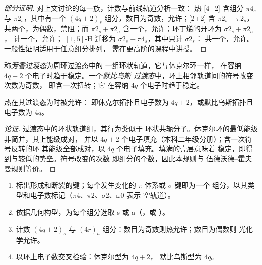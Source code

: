 \begin{proof}[部分证明]
对上文讨论的每一族，计数与前线轨道分析一致：
热 [4+2] 含组分 $\pi4_s$ 与 $\pi2_s$，其中有一个 $(4q + 2)_s$
组分，数目为奇数，允许；[2+2] 含 $\pi2_s + \pi2_s$，共两个，为偶数，禁阻；而
$\pi2_s + \pi2_a$ 含一个，允许；环丁烯的开环为 $\sigma2_s + \pi2_a$，
计一个，允许； $[1,5]$-H 迁移为 $\sigma2_s + \pi4_s$，其中只计 $\sigma2_s$：
共一个，允许。一般性证明适用于任意组分排列，
需在更高阶的课程中讲授。
\end{proof}

\begin{definition}[芳香过渡态与默比乌斯过渡态]\label{def:b3:pericyclic:mobius}
称\emph{芳香过渡态}为周环过渡态中的
一组环状轨道，它与休克尔环一样，
在容纳 $4q + 2$ 个电子时趋于稳定。一个\emph{默比乌斯
过渡态}中，环上相邻轨道间的符号改变次数为奇数，
即含一次扭转；它
在容纳 $4q$ 个电子时趋于稳定。
\end{definition}

\begin{proposition}[芳香过渡态]\label{prop:b3:pericyclic:aromatic-ts}
热在其过渡态为时被允许：
即休克尔拓扑且电子数为 $4q + 2$，或默比乌斯拓扑且电子数为 $4q$。
\end{proposition}

\begin{proof}[论证]
过渡态中的环状轨道组，其行为类似于
环状共轭分子。休克尔环的最低能级非简并，其上能级成对，
并以 $4q + 2$ 个电子填充（本科二年级分册）；含一次符号反转的环
其能级全部成对，以 $4q$ 个电子填充。填满的壳层意味着
稳定，即得到与较低的势垒。符号改变的次数
即组分的个数，因此本规则与
伍德沃德–霍夫曼规则等价。
\end{proof}

\begin{method}[画图与计数组分]\label{met:b3:pericyclic:components}
\begin{enumerate}
  \item 标出形成和断裂的键；每个发生变化的 $\pi$ 体系或 $\sigma$ 键即为一个
        组分，以其类型和电子数标记（$\pi4$、$\pi2$、$\sigma2$、$\omega0$ 表示
        空轨道）。
  \item 依据几何构型，为每个组分选取 s 或 a（，或
        ）。
  \item 计数 $(4q + 2)_s$ 与 $(4r)_a$ 组分：数目为奇数则热允许；数目为偶数则
        光化学允许。
  \item 以环上电子数交叉检验：休克尔型为 $4q + 2$，
        默比乌斯型为 $4q$。
\end{enumerate}
\end{method}

